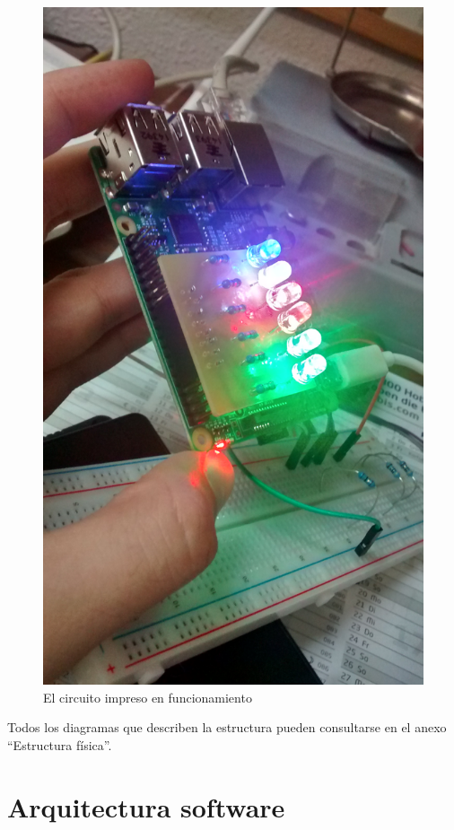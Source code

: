 \begin{figure}[H]
\includegraphics[height=0.255\textheight]{Chapters/Chapter5/Figures/estructuraFinal/pcb9}
\caption{El circuito impreso en funcionamiento}
\end{figure}


Todos los diagramas que describen la estructura pueden consultarse en el anexo ``Estructura física''.

\section{Arquitectura software}

